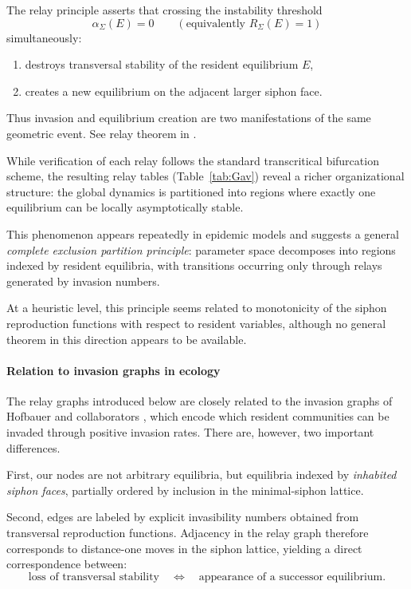 The relay principle asserts that crossing the instability threshold
\[
        \alpha_\Sigma(E)=0
        \qquad
        (\text{equivalently }R_\Sigma(E)=1)
\]
simultaneously:
\begin{enumerate}
\item destroys transversal stability of the resident equilibrium \(E\),
\item creates a new equilibrium on the adjacent larger siphon face.
\end{enumerate}

Thus invasion and equilibrium creation are two manifestations of the
same geometric event.  See relay theorem in \cite{AH26}.

While verification of each relay follows the standard transcritical
bifurcation scheme, the resulting relay tables
(Table~\ref{tab:Gav}) reveal a richer organizational structure:
the global dynamics is partitioned into regions where exactly one
equilibrium can be locally asymptotically stable.

This phenomenon appears repeatedly in epidemic models and suggests a
general \emph{complete exclusion partition principle}:
parameter space decomposes into regions indexed by resident equilibria,
with transitions occurring only through relays generated by invasion
numbers.

At a heuristic level, this principle seems related to monotonicity of
the siphon reproduction functions with respect to resident variables,
although no general theorem in this direction appears to be available.

\paragraph{Relation to invasion graphs in ecology}
The relay graphs introduced below are closely related to the invasion
graphs of Hofbauer and collaborators \cite{HofSch,HofSch10}, which encode which resident
communities can be invaded through positive invasion rates.
There are, however, two important differences.

First, our nodes are not arbitrary equilibria, but equilibria indexed by
\emph{inhabited siphon faces}, partially ordered by inclusion in the
minimal-siphon lattice.

Second, edges are labeled by explicit invasibility numbers obtained from
transversal reproduction functions.  Adjacency in the relay graph
therefore corresponds to distance-one moves in the siphon lattice,
yielding a direct correspondence between:
\[
        \text{loss of transversal stability}
        \quad\Longleftrightarrow\quad
        \text{appearance of a successor equilibrium}.
\]


